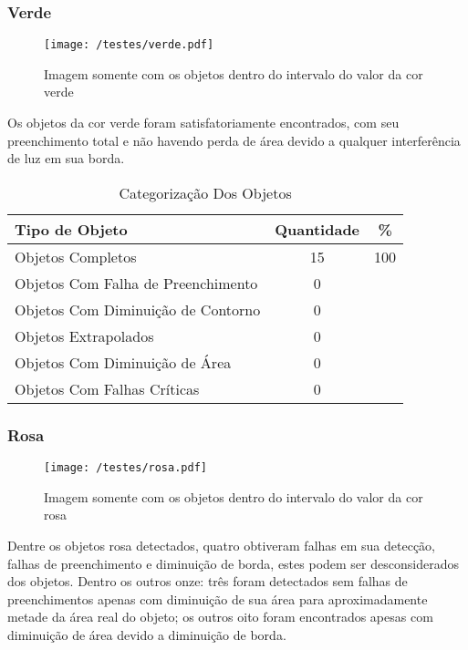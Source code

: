 \subsubsection{Verde}
\begin{figure}[H]
		\centering
		\texttt{[image: /testes/verde.pdf]}
		\caption{Imagem somente com os objetos dentro do intervalo do valor da cor verde}
		\label{disposicaoparte}
	\end{figure}

Os objetos da cor verde foram satisfatoriamente encontrados, com seu preenchimento total e não havendo perda de área devido a qualquer interferência de luz em sua borda.	
	
\begin{table}[h]
\centering
\begin{tabular}{l|c|c}
Tipo de Objeto & Quantidade & \% \\ %
\hline                               %
Objetos Completos &  15 &100 \\
\hline 
Objetos Com Falha de Preenchimento & 0\\
\hline 
Objetos Com Diminuição de Contorno &  0\\
\hline 
Objetos Extrapolados & 0 \\
\hline 
Objetos Com Diminuição de Área &  0 \\
\hline 
Objetos Com Falhas Críticas & 0 \\
\hline 
\end{tabular}
\caption{Categorização Dos Objetos}
\end{table}	
\subsubsection{Rosa}
	
	\begin{figure}[H]
		\centering
		\texttt{[image: /testes/rosa.pdf]}
		\caption{Imagem somente com os objetos dentro do intervalo do valor da cor rosa}
		\label{disposicaoparte}
	\end{figure}
	
Dentre os objetos rosa detectados, quatro obtiveram falhas em sua detecção, falhas de preenchimento e diminuição de borda, estes podem ser desconsiderados dos objetos. Dentro os outros onze: três foram detectados sem falhas de preenchimentos apenas com diminuição de sua área para aproximadamente metade da área real do objeto; os outros oito foram encontrados apesas com diminuição de área devido a diminuição de borda.
	
